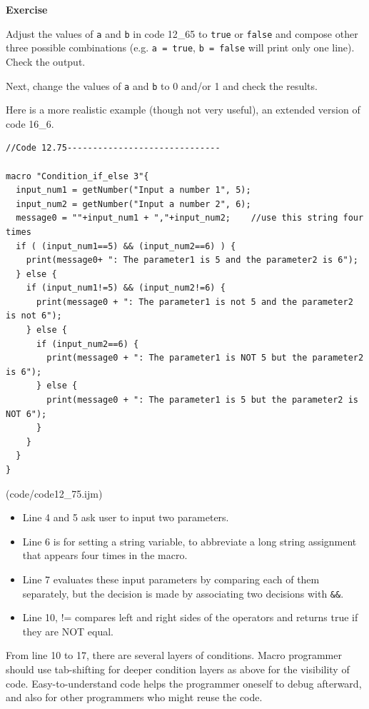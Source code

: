 \documentclass[11pt,a4paper,oneside]{report}
\newenvironment{indentexercise}[1]
{{\setlength{\leftmargin}{2em}}
\textbf{Exercise \thesubsection-#1}
\begin{list}{}
	\item
}
{\end{list}}
\newcommand{\ilcom}[1]{\texttt{\small#1}}
\begin{document}
\begin{indentexercise}{1}
Adjust the values of \ilcom{a} and \ilcom{b} in code 12\_65 to \ilcom{true} or \ilcom{false} and
compose other three possible combinations (e.g. \ilcom{a = true}, \ilcom{b = false} will print
only one line). Check the output.

Next, change the values of \ilcom{a} and \ilcom{b} to 0 and/or
1 and check the results. 
\end{indentexercise}

Here is a more realistic example (though not very useful), an extended version
of code 16\_6.

\begin{lstlisting}[morekeywords={*, if, else}]
//Code 12.75------------------------------

macro "Condition_if_else 3"{
  input_num1 = getNumber("Input a number 1", 5);
  input_num2 = getNumber("Input a number 2", 6);
  message0 = ""+input_num1 + ","+input_num2;	//use this string four times
  if ( (input_num1==5) && (input_num2==6) ) {
    print(message0+ ": The parameter1 is 5 and the parameter2 is 6");
  } else {
    if (input_num1!=5) && (input_num2!=6) {
      print(message0 + ": The parameter1 is not 5 and the parameter2 is not 6");
    } else {
      if (input_num2==6) {
        print(message0 + ": The parameter1 is NOT 5 but the parameter2 is 6");
      } else {
        print(message0 + ": The parameter1 is 5 but the parameter2 is NOT 6");
      }
    }
  }
}
\end{lstlisting}
(code/code12_75.ijm)
\begin{itemize}
\item Line 4 and 5 ask user to input two parameters.
\item Line 6 is for setting a string variable, to abbreviate a long string assignment that appears four times in the macro.
\item Line 7 evaluates these input parameters by comparing each of them separately, but the decision is made by associating two decisions with \ilcom{\&\&}. 
\item Line 10, != compares left and right sides of the operators and returns true if they are NOT equal.   
\end{itemize}
From line 10 to 17, there are several layers of conditions. Macro programmer should use tab-shifting for deeper condition layers as above for the visibility of code. Easy-to-understand code helps the programmer oneself to debug afterward, and also for other programmers who might reuse the code.
 		
\end{document}
